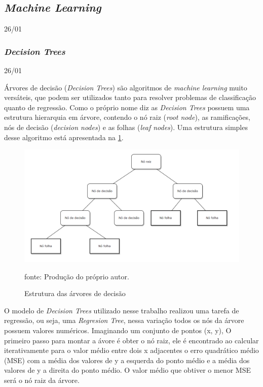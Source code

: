 \documentclass[
  12pt,		%
  a4paper,	%
  openright,%
  oneside,	%
  chapter=TITLE,		%
  section=TITLE,		%
  english,	%
  french,	%
  spanish,	%
  brazil	%
]{abntex2}
\begin{document}
    \subsection{\textit{Machine Learning}}
    26/01


    \subsubsection{\textit{Decision Trees}}
    26/01
    
    Árvores de decisão (\textit{Decision Trees}) são algoritmos de \textit{machine learning} muito versáteis, que podem ser utilizados
    tanto para resolver problemas de classificação quanto de regressão.
    Como o próprio nome diz as \textit{Decision Trees} possuem uma estrutura hierarquia em árvore, contendo o nó raiz (\textit{root node}),
    as ramificações, nós de decisão (\textit{decision nodes}) e as folhas (\textit{leaf nodes}). Uma estrutura simples desse algoritmo
    está apresentada na \ref*{estrutura_decision_tree}.

    \begin{figure}[h]
        \centering
        \caption{Estrutura das árvores de decisão}
        \includegraphics[width=16cm]{../reports/figures/decision_tree_exemple.png}
        \label{estrutura_decision_tree}
        \par
        {\small fonte: Produção do próprio autor.}
    \end{figure}

    O modelo de \textit{Decision Trees} utilizado nesse trabalho realizou uma tarefa de regressão, ou seja, uma \textit{Regresion Tree}, nessa variação 
    todos os nós da árvore possuem valores numéricos. Imaginando um conjunto de pontos (x, y), O primeiro passo para montar a ávore é obter o 
    nó raiz, ele é encontrado ao calcular iterativamente para o valor médio entre dois x adjacentes o erro quadrático médio (MSE) com a média
    dos valores de y a esquerda do ponto médio e a média dos valores de y a direita do ponto médio. O valor médio que obtiver o menor MSE
    será o nó raiz da árvore.
\end{document}
